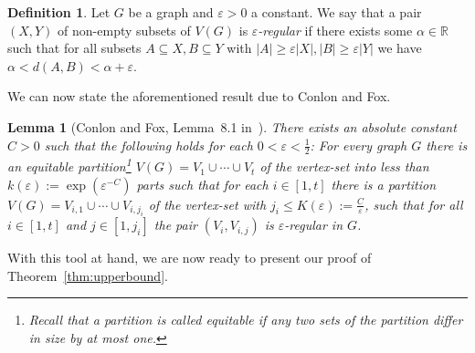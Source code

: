 \documentclass[a4paper,10pt,hidelinks]{amsart}
\newtheorem{lemma}[theorem]{Lemma}
\theoremstyle{definition}
\newtheorem{definition}[theorem]{Definition}
\begin{document}
\begin{definition}
    Let $G$ be a graph and $\varepsilon>0$ a constant. We say that a pair $(X,Y)$ of non-empty subsets of $V(G)$ is \emph{$\varepsilon$-regular} if there exists some $\alpha\in \mathbb{R}$ such that for all subsets $A\subseteq X, B\subseteq Y$ with $|A|\ge \varepsilon |X|, |B|\ge \varepsilon |Y|$ we have $\alpha<d(A,B)<\alpha+\varepsilon$.
\end{definition}
We can now state the aforementioned result due to Conlon and Fox.
\begin{lemma}[Conlon and Fox, Lemma~8.1 in~\cite{conlonfox}]\label{lem:conlonfox}
There exists an absolute constant $C>0$ such that the following holds for each $0 <\varepsilon< \frac{1}{2}$: For every graph $G$ there is an equitable partition\footnote{Recall that a partition is called equitable if any two sets of the partition differ in size by at most one.}
$V(G) = V_1 \cup \cdots \cup V_t$ of the vertex-set into less than $k(\varepsilon):=\exp(\varepsilon^{-C})$ parts such that for each $i\in [1,t]$ there is a
partition $V(G) = V_{i,1} \cup \cdots \cup V_{i,{j_i}}$ of the vertex-set with $j_i \le K(\varepsilon):=\frac{C}{\varepsilon}$, such that for all $i\in [1,t]$ and $j\in [1,j_i]$
the pair $(V_i, V_{i,j})$ is $\varepsilon$-regular in $G$.
\end{lemma}
With this tool at hand, we are now ready to present our proof of Theorem~\ref{thm:upperbound}.
\end{document}
